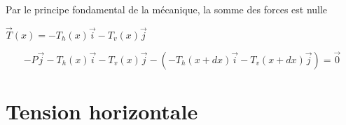 \begin{frame}
Par le principe fondamental de la mécanique, la somme des forces est nulle

\pause\pause\pause
\begin{minipage}{0.49\textwidth}
\shorthandoff{:}
\shorthandon{:}
\pause
\hfil $\vec T(x) = -T_h(x)\vec i - T_v(x) \vec j$  
\end{minipage}

\bigskip
\pause

$$-P \vec j - T_h(x)\vec i - T_v(x) \vec j - \left( - T_h(x+dx)\vec i - T_v(x+dx)  \vec j \right) = \vec 0$$

\pause
{}
\end{frame}


\section{Tension horizontale}

